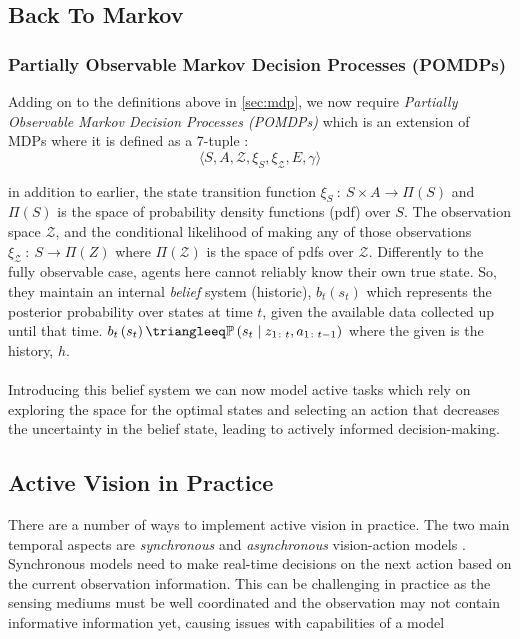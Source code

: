   \subsection{Back To Markov}
  \subsubsection{Partially Observable Markov Decision
  Processes (POMDPs)}\label{sec:pomdp}
  Adding on to the definitions above in \ref{sec:mdp}, we now require \emph{Partially Observable Markov Decision Processes (POMDPs)} 
  which is an extension of MDPs where it is defined as a 7-tuple \cite{thrun2002probabilistic,placed2023surveyactivesimultaneouslocalization}: 
  \[\langle S, A, \mathcal{Z}, \xi_S, \xi_{\mathcal{Z}}, E, \gamma \rangle \]
  
  in addition to earlier, the state transition function \( \xi_S ~\colon~ S \times A \rightarrow \Pi\left(S\right)\) and $\Pi\left(S\right)$ is the space of probability density functions (pdf) over $S$. The observation space $\mathcal{Z}$, and the conditional likelihood of making any of those observations \(\xi_{\mathcal{Z}} ~\colon~ S \rightarrow \Pi\left(Z\right)\) where $\Pi\left(\mathcal{Z}\right)$ is the space of pdfs over $\mathcal{Z}$.
  Differently to the fully observable case, agents here cannot reliably know their own true state. So, they maintain an internal \emph{belief} system (historic), $b_t\left(s_t\right)$ which represents the posterior probability over states at time $t$, given the available data collected up until that time. \(b_t\left(s_t\right) \triangleeq  \mathbb{P}\left(s_t \mid z_{1 \colon t}, a_{1 \colon t - 1}\right)\) where the given is the history, $h$.
  \\\\
  Introducing this belief system we can now model active tasks which rely on exploring the space for the optimal states and selecting an action that decreases the uncertainty in the belief state, leading to actively informed decision-making.

  
  \subsection{Active Vision in Practice}
  There are a number of ways to implement active vision in practice. The two main temporal aspects are \emph{synchronous} and \emph{asynchronous} vision-action models \cite{divyaHandEyeCoordsination}. Synchronous models need to make real-time decisions on the next action based on the current observation information. This can be challenging in practice as the sensing mediums must be well coordinated and the observation may not contain informative information yet, causing issues with capabilities of a model\label{sec:asynch-synch}

